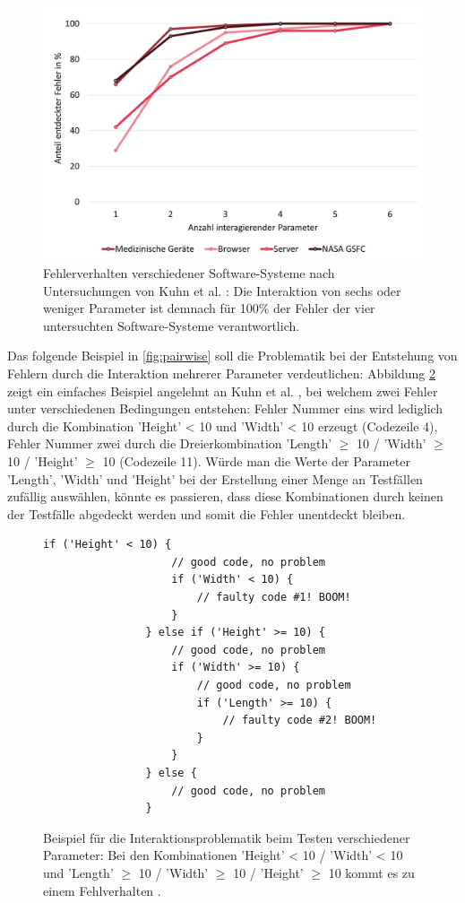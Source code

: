 \begin{figure}[!htb]
\centering
\includegraphics[width=0.6\columnwidth]{images/Fehler_Interaktion.jpg}
\caption{Fehlerverhalten verschiedener Software-Systeme nach Untersuchungen von Kuhn et al. \cite{kuhn2004error}: Die Interaktion von sechs oder weniger Parameter ist demnach für 100\% der Fehler der vier untersuchten Software-Systeme verantwortlich.}
\label{fig:fehlerInteraktion}
\end{figure}

Das folgende Beispiel in \autoref{fig:pairwise} soll die Problematik bei der Entstehung von Fehlern durch die Interaktion mehrerer Parameter verdeutlichen: Abbildung \ref{fig:pairwise} zeigt ein einfaches Beispiel angelehnt an Kuhn et al. \cite{kuhn2010practical}, bei welchem zwei Fehler unter verschiedenen Bedingungen entstehen: Fehler Nummer eins wird lediglich durch die Kombination 'Height' < 10 und 'Width' < 10 erzeugt (Codezeile 4), Fehler Nummer zwei durch die Dreierkombination 'Length' $\geq$ 10 / 'Width' $\geq$ 10 / 'Height' $\geq$ 10 (Codezeile 11). Würde man die Werte der Parameter 'Length', 'Width' und 'Height' bei der Erstellung einer Menge an Testfällen zufällig auswählen, könnte es passieren, dass diese Kombinationen durch keinen der Testfälle abgedeckt werden und somit die Fehler unentdeckt bleiben.

\begin{figure}[!htb]
\lstset{language=Java}
\begin{lstlisting}[frame=single]
				if ('Height' < 10) {
					// good code, no problem
					if ('Width' < 10) {
						// faulty code #1! BOOM!
					}
				} else if ('Height' >= 10) {
					// good code, no problem
					if ('Width' >= 10) {
						// good code, no problem
						if ('Length' >= 10) {
							// faulty code #2! BOOM!
						}
					}
				} else {
					// good code, no problem
				}
\end{lstlisting}
\caption{Beispiel für die Interaktionsproblematik beim Testen verschiedener Parameter: Bei den Kombinationen 'Height' < 10 / 'Width' < 10 und 'Length' $\geq$ 10 / 'Width' $\geq$ 10 / 'Height' $\geq$ 10 kommt es zu einem Fehlverhalten \cite{kuhn2010practical}.}
\label{fig:pairwise}
\end{figure}

